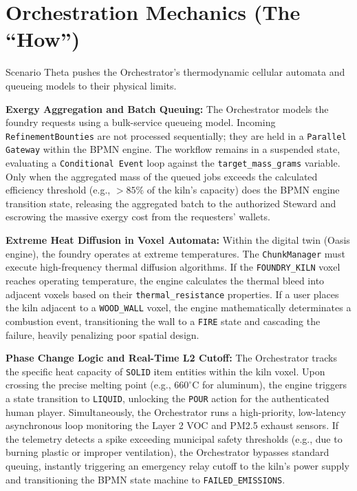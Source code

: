 \section{Orchestration Mechanics (The ``How'')}
Scenario Theta pushes the Orchestrator's thermodynamic cellular automata and queueing models to their physical limits.

\textbf{Exergy Aggregation and Batch Queuing:} The Orchestrator models the foundry requests using a bulk-service queueing model. Incoming \texttt{RefinementBounties} are not processed sequentially; they are held in a \texttt{Parallel Gateway} within the BPMN engine. The workflow remains in a suspended state, evaluating a \texttt{Conditional Event} loop against the \texttt{target\_mass\_grams} variable. Only when the aggregated mass of the queued jobs exceeds the calculated efficiency threshold (e.g., $>85\%$ of the kiln's capacity) does the BPMN engine transition state, releasing the aggregated batch to the authorized Steward and escrowing the massive exergy cost from the requesters' wallets.

\textbf{Extreme Heat Diffusion in Voxel Automata:} Within the digital twin (Oasis engine), the foundry operates at extreme temperatures. The \texttt{ChunkManager} must execute high-frequency thermal diffusion algorithms. If the \texttt{FOUNDRY\_KILN} voxel reaches operating temperature, the engine calculates the thermal bleed into adjacent voxels based on their \texttt{thermal\_resistance} properties. If a user places the kiln adjacent to a \texttt{WOOD\_WALL} voxel, the engine mathematically determinates a combustion event, transitioning the wall to a \texttt{FIRE} state and cascading the failure, heavily penalizing poor spatial design.

\textbf{Phase Change Logic and Real-Time L2 Cutoff:} The Orchestrator tracks the specific heat capacity of \texttt{SOLID} item entities within the kiln voxel. Upon crossing the precise melting point (e.g., $660^\circ\text{C}$ for aluminum), the engine triggers a state transition to \texttt{LIQUID}, unlocking the \texttt{POUR} action for the authenticated human player. Simultaneously, the Orchestrator runs a high-priority, low-latency asynchronous loop monitoring the Layer 2 VOC and PM2.5 exhaust sensors. If the telemetry detects a spike exceeding municipal safety thresholds (e.g., due to burning plastic or improper ventilation), the Orchestrator bypasses standard queuing, instantly triggering an emergency relay cutoff to the kiln's power supply and transitioning the BPMN state machine to \texttt{FAILED\_EMISSIONS}.
